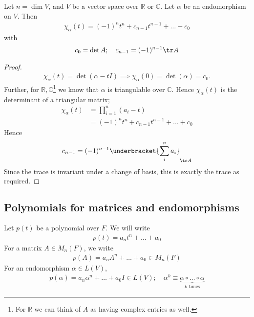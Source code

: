 \begin{lemma}
	Let $n = \dim V$, and $V$ be a vector space over $\mathbb R$ or $\mathbb C$.
	Let $\alpha$ be an endomorphism on $V$.
	Then
	\begin{align*}
		\chi_\alpha(t) = (-1)^n t^n + c_{n-1} t^{n-1} + \dots + c_0
	\end{align*}
	with
	\begin{align*}
		c_0 = \det A;\quad c_{n-1} = (-1)^{n-1} \tr A
	\end{align*}
\end{lemma}
\begin{proof}
	\begin{align*}
		\chi_\alpha(t) = \det(\alpha - t I) \implies \chi_\alpha(0) = \det(\alpha) = c_0.
	\end{align*}
	Further, for $\mathbb R, \mathbb C$\footnote{For $\mathbb{R}$ we can think of $A$ as having complex entries as well.} we know that $\alpha$ is triangulable over $\mathbb C$.
	Hence $\chi_\alpha(t)$ is the determinant of a triangular matrix;
	\begin{align*}
		\chi_\alpha(t) &= \prod_{i=1}^n (a_i - t) \\
		&= (-1)^n t^n + c_{n-1} t^{n-1} + \dots + c_0
	\end{align*}
	Hence
	\begin{align*}
		c_{n-1} = (-1)^{n-1} \underbracket{\sum_i^n  a_i}_{\tr A}
	\end{align*}
	Since the trace is invariant under a change of basis, this is exactly the trace as required.
\end{proof}

\subsection{Polynomials for matrices and endomorphisms}
Let $p(t)$ be a polynomial over $F$.
We will write
\begin{align*}
	p(t) = a_n t^n + \dots + a_0
\end{align*}
For a matrix $A \in M_n(F)$, we write
\begin{align*}
	p(A) = a_n A^n + \dots + a_0 \in M_n(F)
\end{align*}
For an endomorphism $\alpha \in L(V)$,
\begin{align*}
	p(\alpha) = a_n \alpha^n + \dots + a_0 I \in L(V);\quad \alpha^k \equiv \underbrace{\alpha \circ \dots \circ \alpha}_{k \text{ times}}
\end{align*}

